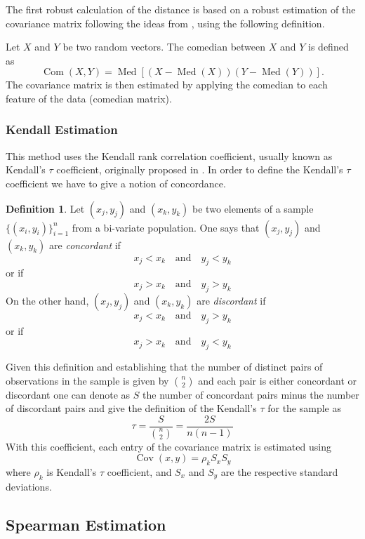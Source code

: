 \documentclass[11pt]{article}
\theoremstyle{definition}
\newtheorem{definition}{Definition}[section]
\theoremstyle{remark}
\theoremstyle{remark}
\theoremstyle{remark}
\begin{document}
The first robust calculation of the distance is based on a robust estimation of
the covariance matrix following the ideas from \parencite{falk1997mad}, using
the following definition.

Let $X$ and $Y$ be two random vectors. The comedian between $X$ and $Y$ is
defined as
%
\[
  \operatorname{Com}(X, Y)=\operatorname{Med}[(X-\operatorname{Med}(X))(Y-\operatorname{Med}(Y))].
\]
%
The covariance matrix is then estimated by applying the comedian to each feature
of the data (comedian matrix).

\subsubsection{Kendall Estimation}

This method uses the Kendall rank correlation coefficient, usually known as
Kendall's $\tau$ coefficient, originally proposed in \parencite{kendall1938new}.
In order to define the Kendall's $\tau$ coefficient we have to give a notion of
concordance.

\begin{definition}
  Let $(x_{j},y_{j})$ and $(x_{k},y_{k})$ be two elements of a sample
  $\{(x_{i},y_{i})\}_{i=1}^{n}$ from a bi-variate population. One says that
  $(x_{j},y_{j})$ and $(x_{k},y_{k})$ are \textit{concordant} if
  \[
    x_{j} < x_{k} \quad \text{and} \quad y_{j} < y_{k}
  \]
  or if
  \[
    x_{j} > x_{k} \quad \text{and} \quad y_{j} > y_{k}
  \]
  On the other hand, $(x_{j},y_{j})$ and $(x_{k},y_{k})$ are \textit{discordant}
  if
  \[
    x_{j} < x_{k} \quad \text{and} \quad y_{j} > y_{k}
  \]
  or if
  \[
    x_{j} > x_{k} \quad \text{and} \quad y_{j} < y_{k}
  \]
\end{definition}

Given this definition and establishing that the number of distinct pairs of
observations in the sample is given by $\binom{n}{2}$ and each pair is either
concordant or discordant one can denote as $S$ the number of concordant pairs
minus the number of discordant pairs and give the definition of the Kendall's
$\tau$ for the sample as
%
\[
  \tau = \dfrac{S}{\binom{n}{2}} = \dfrac{2S}{n(n-1)}
\]
%
With this coefficient, each entry of the covariance matrix is estimated using
%
\[
  \operatorname{Cov}(x, y)=\rho_{k} S_{x} S_{y}
\]
%
where $\rho_{k}$ is Kendall's $\tau$ coefficient, and $S_{x}$ and $S_{y}$ are
the respective standard deviations.

\subsection{Spearman Estimation}
\end{document}
